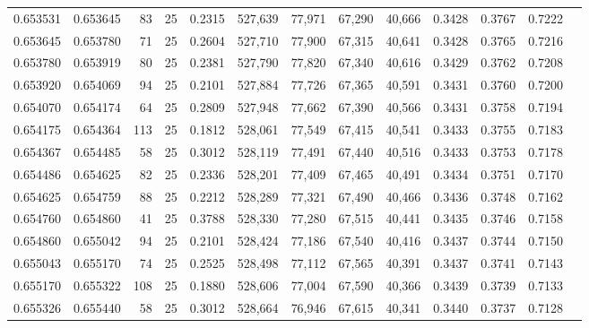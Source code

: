 \begin{tabular}{rrrrrrrrrrrrr}
0.653531 & 0.653645 &    83 &  25 &                                     0.2315 & 527,639 &  77,971 &  67,290 &  40,666 & 0.3428 & 0.3767 & 0.7222 \\
0.653645 & 0.653780 &    71 &  25 &                                     0.2604 & 527,710 &  77,900 &  67,315 &  40,641 & 0.3428 & 0.3765 & 0.7216 \\
0.653780 & 0.653919 &    80 &  25 &                                     0.2381 & 527,790 &  77,820 &  67,340 &  40,616 & 0.3429 & 0.3762 & 0.7208 \\
0.653920 & 0.654069 &    94 &  25 &                                     0.2101 & 527,884 &  77,726 &  67,365 &  40,591 & 0.3431 & 0.3760 & 0.7200 \\
0.654070 & 0.654174 &    64 &  25 &                                     0.2809 & 527,948 &  77,662 &  67,390 &  40,566 & 0.3431 & 0.3758 & 0.7194 \\
0.654175 & 0.654364 &   113 &  25 &                                     0.1812 & 528,061 &  77,549 &  67,415 &  40,541 & 0.3433 & 0.3755 & 0.7183 \\
0.654367 & 0.654485 &    58 &  25 &                                     0.3012 & 528,119 &  77,491 &  67,440 &  40,516 & 0.3433 & 0.3753 & 0.7178 \\
0.654486 & 0.654625 &    82 &  25 &                                     0.2336 & 528,201 &  77,409 &  67,465 &  40,491 & 0.3434 & 0.3751 & 0.7170 \\
0.654625 & 0.654759 &    88 &  25 &                                     0.2212 & 528,289 &  77,321 &  67,490 &  40,466 & 0.3436 & 0.3748 & 0.7162 \\
0.654760 & 0.654860 &    41 &  25 &                                     0.3788 & 528,330 &  77,280 &  67,515 &  40,441 & 0.3435 & 0.3746 & 0.7158 \\
0.654860 & 0.655042 &    94 &  25 &                                     0.2101 & 528,424 &  77,186 &  67,540 &  40,416 & 0.3437 & 0.3744 & 0.7150 \\
0.655043 & 0.655170 &    74 &  25 &                                     0.2525 & 528,498 &  77,112 &  67,565 &  40,391 & 0.3437 & 0.3741 & 0.7143 \\
0.655170 & 0.655322 &   108 &  25 &                                     0.1880 & 528,606 &  77,004 &  67,590 &  40,366 & 0.3439 & 0.3739 & 0.7133 \\
0.655326 & 0.655440 &    58 &  25 &                                     0.3012 & 528,664 &  76,946 &  67,615 &  40,341 & 0.3440 & 0.3737 & 0.7128 \\

\end{tabular}
